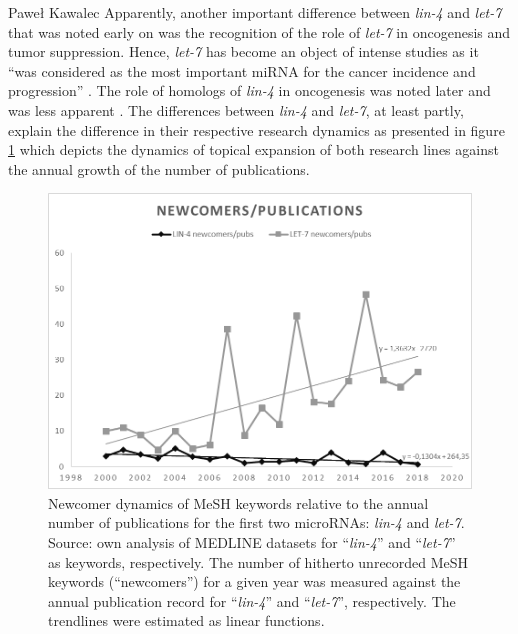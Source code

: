 \begin{artengenv}{Paweł Kawalec}
Apparently, another important difference between \textit{lin-4} and \textit{let-7} that was noted early on was the recognition of the role of \textit{let-7} in oncogenesis and tumor suppression. Hence, \textit{let-7} has become an object of intense studies as it ``was considered as the most important miRNA for the cancer incidence and progression''
\parencite[][]{wang_comprehensive_2018}. %
 The role of homologs of \textit{lin-4} in oncogenesis was noted later and was less apparent 
\parencite[][]{sonoki_insertion_2005}. %
 The differences between \textit{lin-4} and \textit{let-7}, at least partly, explain the difference in their respective research dynamics as presented in figure \ref{fig3kawalec} which depicts the dynamics of topical expansion of both research lines against the annual growth of the number of publications.
\begin{figure}[h!]
	\includegraphics[width=1\textwidth]{ART_Kawalec/Kawalec-img004bw.png}
	\caption{Newcomer dynamics of MeSH keywords relative to the annual number of publications for the first two microRNAs: \textit{lin-4} and \textit{let-7}. Source: own analysis of MEDLINE datasets for ``\textit{lin-4}'' and ``\textit{let-7}'' as keywords, respectively. The number of hitherto unrecorded MeSH keywords (``newcomers'') for a given year was measured against the annual publication record for ``\textit{lin-4}'' and ``\textit{let-7}'', respectively. The trendlines were estimated as linear functions.}\label{fig3kawalec}
\end{figure}


\end{artengenv}
